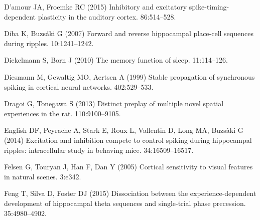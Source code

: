 \begin{thebibliography}{}
D'amour JA, Froemke RC (2015{\rm{}})
\newblock Inhibitory and excitatory spike-timing-dependent plasticity in the auditory cortex.
 86:514--528.


Diba K, Buzs\'{a}ki G (2007{\rm{}})
\newblock Forward and reverse hippocampal place-cell sequences during ripples.
 10:1241--1242.

Diekelmann S, Born J (2010{\rm{}})
\newblock The memory function of sleep.
 11:114--126.

Diesmann M, Gewaltig MO, Aertsen A (1999{\rm{}})
\newblock Stable propagation of synchronous spiking in cortical neural
  networks.
 402:529--533.

Dragoi G, Tonegawa S (2013{\rm{}})
\newblock Distinct preplay of multiple novel spatial experiences in the rat.
 110:9100--9105.


  English DF, Peyrache A, Stark E, Roux L, Vallentin D, Long MA, Buzs\`{a}ki G (2014{\rm{}})
\newblock Excitation and inhibition compete to control spiking during hippocampal ripples: intracellular study in behaving mice.
 34:16509--16517.

Felsen G, Touryan J, Han F, Dan Y (2005{\rm{}})
\newblock Cortical sensitivity to visual features in natural scenes.
 3:e342.

Feng T, Silva D, Foster DJ (2015{\rm{}})
\newblock Dissociation between the experience-dependent development of hippocampal theta sequences and single-trial phase precession.
 35:4980--4902.


\end{thebibliography}
